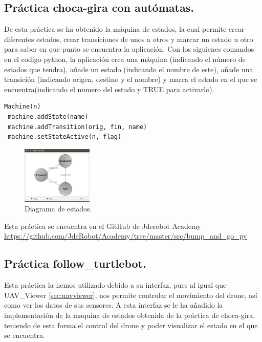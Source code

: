 \subsection{Pr\'actica choca-gira con aut\'omatas.}
\label{sec.JdeRobotAcademy}
\hspace{1 cm} De esta pr\'actica se ha obtenido la m\'aquina de estados, la cual permite crear diferentes estados, crear transiciones de unos a otros y marcar un estado u otro para saber en que punto se encuentra la aplicaci\'on. Con los siguienes comandos en el codigo python, la aplicaci\'on crea una m\'aquina (indicando el n\'umero de estados que tendra), añade un estado (indicando el nombre de este), añade una transici\'on (indicando origen, destino y el nombre) y marca el estado en el que se encuentra(indicando el numero del estado y TRUE para activarlo). 

\begin{lstlisting}[backgroundcolor=\color{yellow}]
 Machine(n)
 machine.addState(name) 
 machine.addTransition(orig, fin, name) 
 machine.setStateActive(n, flag) 
\end{lstlisting}


\begin{figure}[ht]
	\centering
		\includegraphics[width=0.3\textwidth]{imgs/ChocaGiraAutomata.png}
		\caption{Diagrama de estados.}
	\label{fig:Diag_estados}
\end{figure}

Esta pr\'actica se encuentra en el GitHub de Jderobot Academy  \url{https://github.com/JdeRobot/Academy/tree/master/src/bump_and_go_py}


\subsection{Pr\'actica follow\_turtlebot.}
\hspace{1 cm} Esta pr\'actica la hemos utilizado debido a su interfaz, pues al igual que UAV\_Viewer \ref{sec:uavviewer}, nos permite controlar el movimiento del drone, as\'i como ver los datos de sus sensores. A esta interfaz se le ha añadido la implementaci\'on de la maquina de estados obtenida de la pr\'actica de choca-gira, teniendo de esta forma el control del drone y poder visualizar el estado en el que se encuentra.

